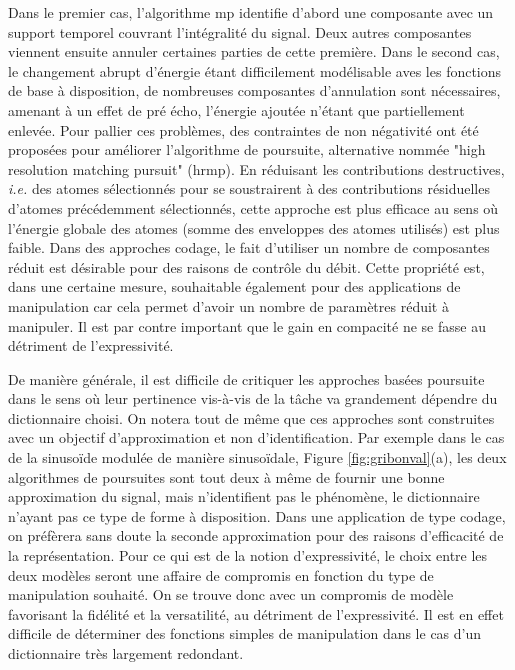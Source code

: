 Dans le premier cas, l'algorithme mp identifie d'abord une composante avec un support temporel couvrant l'intégralité du signal. Deux autres composantes viennent ensuite annuler certaines parties de cette première. Dans le second cas, le changement abrupt d'énergie étant difficilement modélisable aves les fonctions de base à disposition, de nombreuses composantes d'annulation sont nécessaires, amenant à un effet de pré écho, l'énergie ajoutée n'étant que partiellement enlevée. Pour pallier ces problèmes, des contraintes de non négativité ont été proposées pour améliorer l'algorithme de poursuite, alternative nommée "high resolution matching pursuit" (hrmp). En réduisant les contributions destructives, \textit{i.e.} des atomes sélectionnés pour se soustrairent à des contributions résiduelles d'atomes précédemment sélectionnés, cette approche est plus efficace au sens où l'énergie globale des atomes (somme des enveloppes des atomes utilisés) est plus faible. Dans des approches codage, le fait d'utiliser un nombre de composantes réduit est désirable pour des raisons de contrôle du débit. Cette propriété est, dans une certaine mesure, souhaitable également pour des applications de manipulation car cela permet d'avoir un nombre de paramètres réduit à manipuler. Il est par contre important que le gain en compacité ne se fasse au détriment de l'expressivité.



De manière générale, il est difficile de critiquer les approches basées poursuite dans le sens où leur pertinence vis-à-vis de la tâche va grandement dépendre du dictionnaire choisi. On notera tout de même que ces approches sont construites avec un objectif d'approximation et non d'identification. Par exemple dans le cas de la sinusoïde modulée de manière sinusoïdale, Figure \ref{fig:gribonval}(a), les deux algorithmes de poursuites sont tout deux à même de fournir une bonne approximation du signal, mais \og n'identifient \fg pas le phénomène, le dictionnaire n'ayant pas ce type de forme à disposition. Dans une application de type codage, on préfèrera sans doute la seconde approximation pour des raisons d'efficacité de la représentation. Pour ce qui est de la notion d'expressivité, le choix entre les deux modèles seront une affaire de compromis en fonction du type de manipulation souhaité. On se trouve donc avec un compromis de modèle favorisant la fidélité et la versatilité, au détriment de l'expressivité. Il est en effet difficile de déterminer des fonctions simples de manipulation dans le cas d'un dictionnaire très largement redondant.

